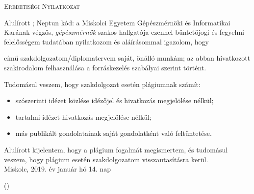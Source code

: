 
\begin{center}
	\textsc{\Large{Eredetiségi Nyilatkozat}}
\end{center}
{
	Alulírott \textbf{\nev}; Neptun kód: \textit{\neptun} a Miskolci Egyetem Gépészmérnöki és Informatikai Karának végzős, \textit{gépészmérnök} szakos hallgatója ezennel büntetőjogi és fegyelmi felelősségem tudatában nyilatkozom és aláírásommal igazolom, hogy
	\begin{center}
		\cim
	\end{center}
	című szakdolgozatom/diplomatervem saját, önálló munkám; az abban hivatkozott szakirodalom felhasználása a forráskezelés szabályai szerint történt.
	
	Tudomásul veszem, hogy szakdolgozat esetén plágiumnak számít:
	\begin{itemize}
		\item szószerinti idézet közlése idézőjel és hivatkozás megjelölése nélkül;
		\item	tartalmi idézet hivatkozás megjelölése nélkül;
		\item	más publikált gondolatainak saját gondolatként való feltüntetése.	 
	\end{itemize}
	Alulírott kijelentem, hogy a plágium fogalmát megismertem, és tudomásul veszem, hogy
	plágium esetén szakdolgozatom visszautasításra kerül.\\
	Miskolc, 2019. év január hó 14. nap
	
	
	{\raggedleft\vspace{1cm}(\textit{\nev})
		
	}
}


